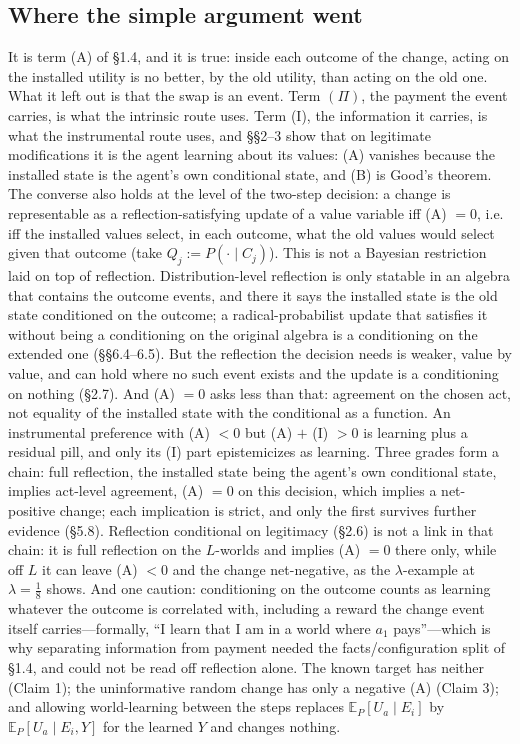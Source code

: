 \documentclass[11pt,a4paper]{article}
\begin{document}
\subsection{Where the simple argument went}
It is term (A) of \S1.4, and it is true: inside each outcome of the change, acting on the installed utility is no better, by the old utility, than acting on the old one. What it left out is that the swap is an event. Term $(\Pi)$, the payment the event carries, is what the intrinsic route uses. Term (I), the information it carries, is what the instrumental route uses, and \S\S2--3 show that on legitimate modifications it is the agent learning about its values: (A) vanishes because the installed state is the agent's own conditional state, and (B) is Good's theorem. The converse also holds at the level of the two-step decision: a change is representable as a reflection-satisfying update of a value variable iff (A) $= 0$, i.e. iff the installed values select, in each outcome, what the old values would select given that outcome (take $Q_j := P(\cdot \mid C_j)$). This is not a Bayesian restriction laid on top of reflection. Distribution-level reflection is only statable in an algebra that contains the outcome events, and there it says the installed state is the old state conditioned on the outcome; a radical-probabilist update that satisfies it without being a conditioning on the original algebra is a conditioning on the extended one (\S\S6.4--6.5). But the reflection the decision needs is weaker, value by value, and can hold where no such event exists and the update is a conditioning on nothing (\S2.7). And (A) $= 0$ asks less than that: agreement on the chosen act, not equality of the installed state with the conditional as a function. An instrumental preference with (A) $< 0$ but (A) $+$ (I) $> 0$ is learning plus a residual pill, and only its (I) part epistemicizes as learning. Three grades form a chain: full reflection, the installed state being the agent's own conditional state, implies act-level agreement, (A) $= 0$ on this decision, which implies a net-positive change; each implication is strict, and only the first survives further evidence (\S5.8). Reflection conditional on legitimacy (\S2.6) is not a link in that chain: it is full reflection on the $L$-worlds and implies (A) $= 0$ there only, while off $L$ it can leave (A) $< 0$ and the change net-negative, as the $\lambda$-example at $\lambda = \tfrac18$ shows. And one caution: conditioning on the outcome counts as learning whatever the outcome is correlated with, including a reward the change event itself carries---formally, ``I learn that I am in a world where $a_1$ pays''---which is why separating information from payment needed the facts/configuration split of \S1.4, and could not be read off reflection alone. The known target has neither (Claim 1); the uninformative random change has only a negative (A) (Claim 3); and allowing world-learning between the steps replaces $\mathbb E_P[ U_a \mid E_i]$ by $\mathbb E_P[ U_a \mid E_i, Y]$ for the learned $Y$ and changes nothing.
\end{document}
